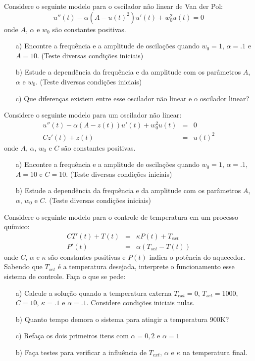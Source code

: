 \begin{exer} Considere o seguinte modelo para o oscilador não linear de Van der Pol:
\begin{equation} u''(t) - \alpha (A-u(t)^2)u'(t) + w_0^2u(t)=0 \end{equation}
onde $A$, $\alpha$ e $w_0$ são constantes positivas.
\begin{itemize}
\item[a)] Encontre a frequência e a amplitude de oscilações quando $w_0=1$, $\alpha=.1$ e $A=10$. (Teste diversas condições iniciais)
\item[b)] Estude a dependência da frequência e da amplitude com os parâmetros  $A$, $\alpha$ e $w_0$. (Teste diversas condições iniciais)
\item[c)] Que diferenças existem entre esse oscilador não linear e o oscilador linear?
\end{itemize}
\end{exer}

\begin{exer} Considere o seguinte modelo para um oscilador não linear:
\begin{eqnarray}
u''(t)-\alpha(A-z(t))u'(t)+w_0^2 u(t)&=&0\\
Cz'(t)+z(t)&=&u(t)^2
\end{eqnarray}
onde $A$, $\alpha$, $w_0$ e $C$ são constantes positivas.
\begin{itemize}
\item[a)] Encontre a frequência e a amplitude de oscilações quando $w_0=1$, $\alpha=.1$, $A=10$ e $C=10$. (Teste diversas condições iniciais)
\item[b)] Estude a dependência da frequência e da amplitude com os parâmetros  $A$, $\alpha$, $w_0$ e $C$. (Teste diversas condições iniciais)
\end{itemize}
\end{exer}

\begin{exer} Considere o seguinte modelo para o controle de temperatura em um processo químico:
\begin{eqnarray}
CT'(t)+T(t)&=&\kappa P(t)+T_{ext}\\
P'(t)&=&\alpha(T_{set}-T(t))
\end{eqnarray}
onde $C$, $\alpha$ e $\kappa$ são constantes positivas e $P(t)$ indica o potência do aquecedor. Sabendo que $T_{set}$ é a temperatura desejada, interprete o funcionamento esse sistema de controle. Faça o que se pede:
\begin{itemize}
\item[a)] Calcule a solução quando a temperatura externa $T_{ext}=0$, $T_{set}=1000$, $C=10$, $\kappa=.1$ e $\alpha=.1$. Considere condições iniciais nulas.
\item[b)] Quanto tempo demora o sistema para atingir a temperatura 900K?
\item[c)] Refaça os dois primeiros itens com $\alpha=0,2$ e $\alpha=1$
\item[b)] Faça testes para verificar a influência de $T_{ext}$, $\alpha$ e $\kappa$ na temperatura final.
\end{itemize}
\end{exer}

